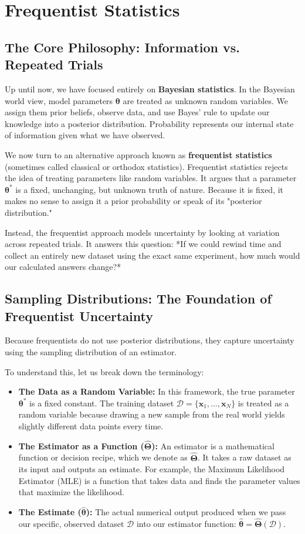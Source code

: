 \documentclass{article}
\begin{document}
\section{Frequentist Statistics}

\subsection{The Core Philosophy: Information vs. Repeated Trials}
Up until now, we have focused entirely on \textbf{Bayesian statistics}. In the Bayesian world view, model parameters $\boldsymbol{\theta}$ are treated as unknown random variables. We assign them prior beliefs, observe data, and use Bayes' rule to update our knowledge into a posterior distribution. Probability represents our internal state of information given what we have observed.

We now turn to an alternative approach known as \textbf{frequentist statistics} (sometimes called classical or orthodox statistics). Frequentist statistics rejects the idea of treating parameters like random variables. It argues that a parameter $\boldsymbol{\theta}^*$ is a fixed, unchanging, but unknown truth of nature. Because it is fixed, it makes no sense to assign it a prior probability or speak of its "posterior distribution." 

Instead, the frequentist approach models uncertainty by looking at variation across repeated trials. It answers this question: *If we could rewind time and collect an entirely new dataset using the exact same experiment, how much would our calculated answers change?*

\subsection{Sampling Distributions: The Foundation of Frequentist Uncertainty}
Because frequentists do not use posterior distributions, they capture uncertainty using the sampling distribution of an estimator.

To understand this, let us break down the terminology:
\begin{itemize}
    \item \textbf{The Data as a Random Variable:} In this framework, the true parameter $\boldsymbol{\theta}^*$ is a fixed constant. The training dataset $\mathcal{D} = \{\mathbf{x}_1, \dots, \mathbf{x}_N\}$ is treated as a random variable because drawing a new sample from the real world yields slightly different data points every time.
    \item \textbf{The Estimator as a Function ($\hat{\boldsymbol{\Theta}}$):} An estimator is a mathematical function or decision recipe, which we denote as $\hat{\boldsymbol{\Theta}}$. It takes a raw dataset as its input and outputs an estimate. For example, the Maximum Likelihood Estimator (MLE) is a function that takes data and finds the parameter values that maximize the likelihood.
    \item \textbf{The Estimate ($\hat{\boldsymbol{\theta}}$):} The actual numerical output produced when we pass our specific, observed dataset $\mathcal{D}$ into our estimator function: $\hat{\boldsymbol{\theta}} = \hat{\boldsymbol{\Theta}}(\mathcal{D})$.
\end{itemize}
\end{document}
